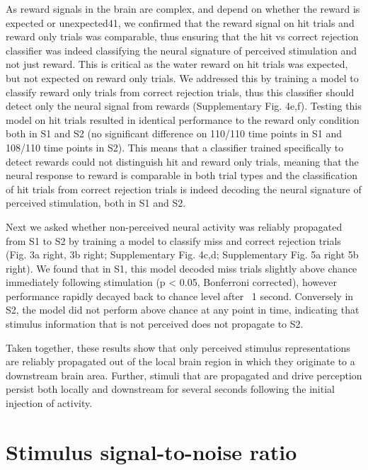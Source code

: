 As reward signals in the brain are complex, and depend on whether the reward is expected or unexpected41, we confirmed that the reward signal on hit trials and reward only trials was comparable, thus ensuring that the hit vs correct rejection classifier was indeed classifying the neural signature of perceived stimulation and not just reward. This is critical as the water reward on hit trials was expected, but not expected on reward only trials. We addressed this by training a model to classify reward only trials from correct rejection trials, thus this classifier should detect only the neural signal from rewards (Supplementary Fig. 4e,f). Testing this model on hit trials resulted in identical performance to the reward only condition both in S1 and S2 (no significant difference on 110/110 time points in S1 and 108/110 time points in S2). This means that a classifier trained specifically to detect rewards could not distinguish hit and reward only trials, meaning that the neural response to reward is comparable in both trial types and the classification of hit trials from correct rejection trials is indeed decoding the neural signature of perceived stimulation, both in S1 and S2.

Next we asked whether non-perceived neural activity was reliably propagated from S1 to S2 by training a model to classify miss and correct rejection trials (Fig. 3a right, 3b right; Supplementary Fig. 4c,d; Supplementary Fig. 5a right 5b right). We found that in S1, this model decoded miss trials slightly above chance immediately following stimulation (p < 0.05, Bonferroni corrected), however performance rapidly decayed back to chance level after ~1 second. Conversely in S2, the model did not perform above chance at any point in time, indicating that stimulus information that is not perceived does not propagate to S2.

Taken together, these results show that only perceived stimulus representations are reliably propagated out of the local brain region in which they originate to a downstream brain area. Further, stimuli that are propagated and drive perception persist both locally and downstream for several seconds following the initial injection of activity.
















\section{Stimulus signal-to-noise ratio}

